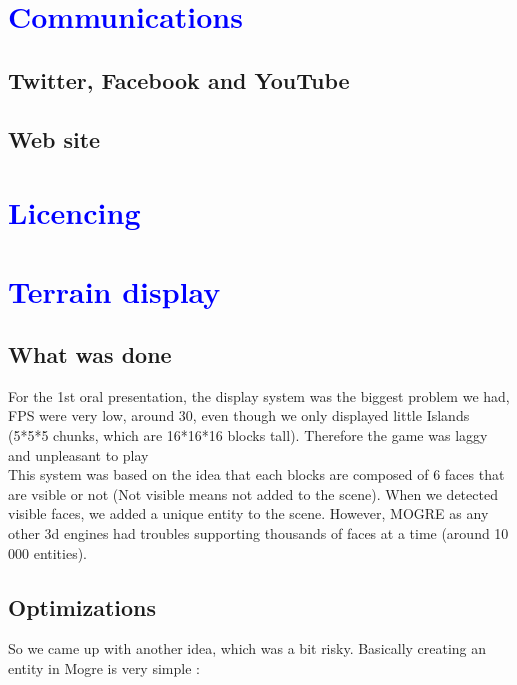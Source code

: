 \documentclass[article]{report}             %
\begin{document}
  		\chapter{\textcolor{blue}{Communications}}
			\section{Twitter, Facebook and YouTube }
				
			\section{Web site}
				
		\chapter{\textcolor{blue}{Licencing}}

		\chapter{\textcolor{blue}{Terrain display}}
			\section{What was done}
				For the 1st oral presentation, the display system was the biggest problem we had, FPS were very low, around 30, even though we only displayed little Islands (5*5*5 chunks, which are 16*16*16 blocks tall). Therefore the game was laggy and unpleasant to play \\
				This system was based on the idea that each blocks are composed of 6 faces that are vsible or not (Not visible means not added to the scene). When we detected visible faces, we added a unique entity to the scene. However, MOGRE as any other 3d engines had troubles supporting thousands of faces at a time (around 10 000 entities).

			\section{Optimizations}
				So we came up with another idea, which was a bit risky. Basically creating an entity in Mogre is very simple :\\
\end{document}
